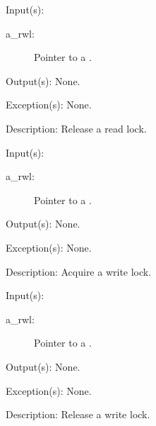 \begin{capi}
\begin{capilist}
	\item[Input(s): ]
		\begin{description}\item[]
		\item[a\_rwl: ]
			Pointer to a .
		\end{description}
	\item[Output(s): ] None.
	\item[Exception(s): ] None.
	\item[Description: ]
		Release a read lock.
	\end{capilist}
\label{rwl_wlock}
	\begin{capilist}
	\item[Input(s): ]
		\begin{description}\item[]
		\item[a\_rwl: ]
			Pointer to a .
		\end{description}
	\item[Output(s): ] None.
	\item[Exception(s): ] None.
	\item[Description: ]
		Acquire a write lock.
	\end{capilist}
\label{rwl_wunlock}
	\begin{capilist}
	\item[Input(s): ]
		\begin{description}\item[]
		\item[a\_rwl: ]
			Pointer to a \classname{rwl}.
		\end{description}
	\item[Output(s): ] None.
	\item[Exception(s): ] None.
	\item[Description: ]
		Release a write lock.
	\end{capilist}
\end{capi}
